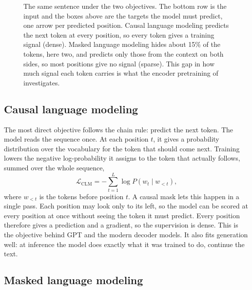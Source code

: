 \begin{figure}[t]
{\begin{tikzpicture}
\end{tikzpicture}}
\vspace{3pt}
\caption{The same sentence under the two objectives. The bottom row is the input
and the boxes above are the targets the model must predict, one arrow per predicted
position. Causal language modeling predicts the next token at every position, so
every token gives a training signal (dense). Masked language modeling hides about
15\% of the tokens, here two, and predicts only those from the context on both
sides, so most positions give no signal (sparse). This gap in how much signal each
token carries is what the encoder pretraining of  investigates.}
\label{fig:lm-objectives}
\end{figure}

\subsection{Causal language modeling}

The most direct objective follows the chain rule: predict the next token. The model
reads the sequence once. At each position $t$, it gives a probability distribution
over the vocabulary for the token that should come next. Training lowers the
negative log-probability it assigns to the token that actually follows, summed over
the whole sequence,
\[
  \mathcal{L}_{\text{CLM}} = -\sum_{t=1}^{L} \log P(w_t \mid w_{<t}),
\]
where $w_{<t}$ is the tokens before position $t$. A causal mask lets this happen in
a single pass. Each position may look only to its left, so the model can be scored
at every position at once without seeing the token it must predict. Every position
therefore gives a prediction and a gradient, so the supervision is dense. This is
the objective behind GPT \citep{Radford2018ImprovingLU} and the modern decoder
models. It also fits generation well: at inference the model does exactly what it
was trained to do, continue the text.

\subsection{Masked language modeling}

